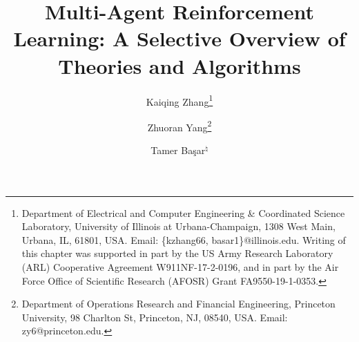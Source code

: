 \documentclass[12pt]{article}
\title{\LARGE Multi-Agent Reinforcement Learning: A Selective Overview of  Theories and  Algorithms}
\begin{document}
 
\author{Kaiqing Zhang\thanks{Department of Electrical and Computer Engineering \&  Coordinated Science Laboratory, University of Illinois at Urbana-Champaign, 1308 West Main, Urbana, IL,  61801, USA. Email: \{kzhang66, basar1\}@illinois.edu. Writing of this chapter was supported in part by the US Army Research Laboratory (ARL) Cooperative Agreement W911NF-17-2-0196, and in part by the Air Force Office of Scientific Research (AFOSR) Grant FA9550-19-1-0353.}  
 \and Zhuoran Yang\thanks{Department of Operations Research and Financial Engineering, Princeton University, 98 Charlton St, Princeton, NJ, 08540, USA.  {Email: zy6@princeton.edu}.} \and Tamer Ba\c{s}ar$^\natural$}
\date{}
%
%
\maketitle   

 
    
 
\end{document}

